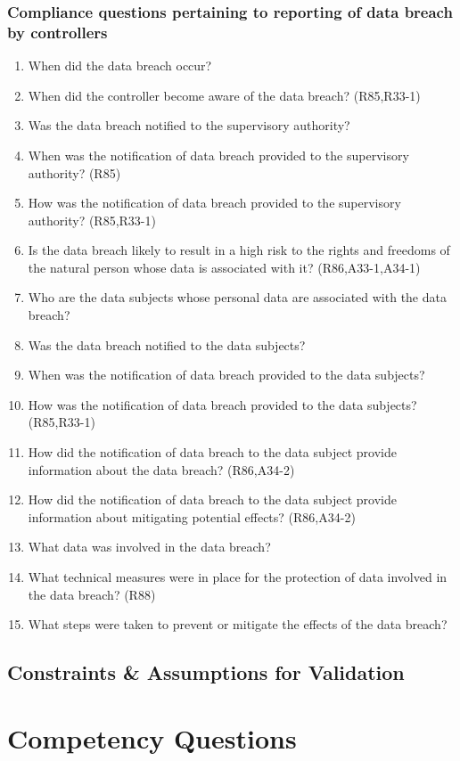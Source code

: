 \subsubsection{Compliance questions pertaining to reporting of data breach by controllers}
\begin{enumerate}[label={\textit{CMQ.\theenumi}},resume]
    \item When did the data breach occur?
    \item When did the controller become aware of the data breach? (R85,R33-1)
    \item Was the data breach notified to the supervisory authority?
    \item When was the notification of data breach provided to the supervisory authority? (R85)
    \item How was the notification of data breach provided to the supervisory authority? (R85,R33-1)
    \item Is the data breach likely to result in a high risk to the rights and freedoms of the natural person whose data is associated with it? (R86,A33-1,A34-1)
    \item Who are the data subjects whose personal data are associated with the data breach?
    \item Was the data breach notified to the data subjects?
    \item When was the notification of data breach provided to the data subjects?
    \item How was the notification of data breach provided to the data subjects? (R85,R33-1)
    \item How did the notification of data breach to the data subject provide information about the data breach? (R86,A34-2)
    \item How did the notification of data breach to the data subject provide information about mitigating potential effects? (R86,A34-2)
    \item What data was involved in the data breach?
    \item What technical measures were in place for the protection of data involved in the data breach? (R88)
    \item What steps were taken to prevent or mitigate the effects of the data breach?
\end{enumerate}

\subsection{Constraints \& Assumptions for Validation}\label{sec:info:constraints}

\section{Competency Questions}\label{sec:info:competency-questions}


